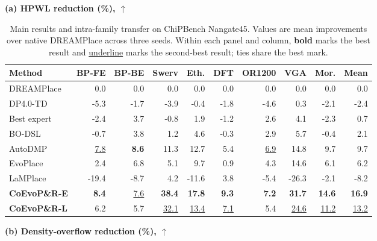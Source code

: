 \begin{table}[t]
\centering
\caption{Main results and intra-family transfer on ChiPBench Nangate45.
Values are mean improvements over native DREAMPlace across three seeds.
Within each panel and column, \colorbox{rankfirst}{\textbf{bold}} marks the
best result and \colorbox{ranksecond}{\underline{underline}} marks the
second-best result; ties share the best mark.}
\label{tab:chipbench-main}

\scriptsize
\renewcommand{\arraystretch}{1.02}
\setlength{\tabcolsep}{1.5pt}

\begin{minipage}[t]{0.492\textwidth}
\centering
\textbf{(a) HPWL reduction (\%), $\uparrow$}\par
\vspace{2pt}

\begin{tabular*}{\linewidth}{
  @{\extracolsep{\fill}} l *{9}{r} @{}
}
\toprule
Method
& BP-FE & BP-BE & Swerv & Eth.
& DFT & OR1200 & VGA & Mor. & Mean \\
\midrule
DREAMPlace       & 0.0 & 0.0 & 0.0 & 0.0 & 0.0 & 0.0 & 0.0 & 0.0 & 0.0 \\
DP4.0-TD         & -5.3 & -1.7 & -3.9 & -0.4 & -1.8 & -4.6 & 0.3 & -2.1 & -2.4 \\
Best expert      & -2.4 & 3.7 & -0.8 & 1.9 & -1.2 & 2.6 & 4.1 & -2.3 & 0.7 \\
BO-DSL           & -0.7 & 3.8 & 1.2 & 4.6 & -0.3 & 2.9 & 5.7 & -0.4 & 2.1 \\
AutoDMP          & \cellcolor{ranksecond}\underline{7.8} & \cellcolor{rankfirst}\textbf{8.6} & 11.3 & 12.7 & 5.4 & \cellcolor{ranksecond}\underline{6.9} & 14.8 & 9.7 & 9.7 \\
EvoPlace         & 2.4 & 6.8 & 5.1 & 9.7 & 0.9 & 4.3 & 14.6 & 6.1 & 6.2 \\
LaMPlace         & -19.4 & -8.7 & 4.2 & -11.6 & 3.8 & -5.4 & -26.3 & -2.1 & -8.2 \\
\midrule
\textbf{CoEvoP\&R-E}
                 & \cellcolor{rankfirst}\textbf{8.4} & \cellcolor{ranksecond}\underline{7.6} & \cellcolor{rankfirst}\textbf{38.4} & \cellcolor{rankfirst}\textbf{17.8} & \cellcolor{rankfirst}\textbf{9.3} & \cellcolor{rankfirst}\textbf{7.2} & \cellcolor{rankfirst}\textbf{31.7} & \cellcolor{rankfirst}\textbf{14.6} & \cellcolor{rankfirst}\textbf{16.9} \\
\textbf{CoEvoP\&R-L}
                 & 6.2 & 5.7 & \cellcolor{ranksecond}\underline{32.1} & \cellcolor{ranksecond}\underline{13.4} & \cellcolor{ranksecond}\underline{7.1} & 5.4 & \cellcolor{ranksecond}\underline{24.6} & \cellcolor{ranksecond}\underline{11.2} & \cellcolor{ranksecond}\underline{13.2} \\
\bottomrule
\end{tabular*}
\end{minipage}
\hfill%
\begin{minipage}[t]{0.492\textwidth}
\centering
\textbf{(b) Density-overflow reduction (\%), $\uparrow$}\par
\vspace{2pt}


\end{minipage}
\end{table}

